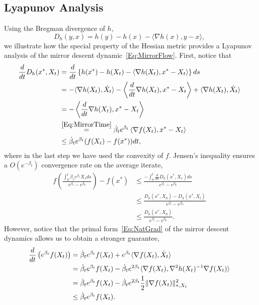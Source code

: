 \documentclass[11pt]{article}
\theoremstyle{plain}
\begin{document}
\subsection{Lyapunov Analysis}
Using the Bregman divergence of $h$,
\begin{equation}
D_h(y,x) = h(y) - h(x) - \langle \nabla h(x), y- x\rangle, 
\end{equation}
we illustrate how the special property of the Hessian metric provides a Lyapunov analysis of the mirror descent dynamic~\eqref{Eq:MirrorFlow}. First, notice that 
\begin{subequations}\label{Eq:Disc}
\begin{align}
\frac{d}{dt} D_h(x^\ast,X_t) & =  \frac{d}{dt} \left\{h(x^\ast) - h(X_t) - \langle \nabla h(X_t), x^\ast- X_t\rangle \right\} ds\notag\\
& = - \langle \nabla h(X_t), \dot X_t\rangle -\left\langle \frac{d}{dt} \nabla h(X_t),x^\ast - X_t\right\rangle  + \langle \nabla h(X_t), \dot X_t\rangle \notag\\
&=  -\left\langle \frac{d}{dt} \nabla h(X_t),x^\ast - X_t\right\rangle\notag\\
& \overset{\eqref{Eq:MirrorTime}}{=}  \dot \beta_t e^{\beta_t} \left\langle \nabla f(X_t), x^\ast - X_t\right\rangle \notag\\
& \leq  \dot \beta_t e^{\beta_t} (f(X_t) - f(x^\ast)) dt,\label{Eq:Bound1} 
\end{align}
\end{subequations}
where in the last step we have used the convexity of $f$. Jensen's inequality ensures a $O(e^{-\beta_t})$ convergence rate on the average iterate,  %
\begin{align*}
f\left(\frac{\int_0^t \dot \beta_s e^{\beta_s} X_s ds}{e^{\beta_t} - e^{\beta_0}}\right) - f(x^\ast) &\leq \frac{ - \int_0^t \frac{d}{ds} D_h(x^\ast,X_s)ds}{e^{\beta_t} - e^{\beta_0}} \\
&\leq \frac{D_h(x^\ast,X_0) - D_h(x^\ast, X_t)}{e^{\beta_t} - e^{\beta_0}}\\
&\leq \frac{D_h(x^\ast,X_0)}{e^{\beta_t} - e^{\beta_0}}.
\end{align*}
 However, notice that the primal form~\eqref{Eq:NatGrad} of the mirror descent dynamics allows us to obtain a stronger guarantee,
 \begin{subequations}\label{Eq:Lem}
 \begin{align}
\frac{d}{dt}\left( e^{\beta_t} f(X_t) \right) &= \dot \beta_t e^{\beta_t} f(X_t) + e^{\beta_t}\langle \nabla f(X_t), \dot X_t\rangle\notag \\
&= \dot \beta_t e^{\beta_t}f(X_t) - \dot \beta_t e^{2\beta_t}\langle \nabla f(X_t), \nabla^2 h(X_t)^{-1}\nabla f(X_t)\rangle \notag\\
& = \dot \beta_t e^{\beta_t}f(X_t) - \dot \beta_t e^{2\beta_t}\frac{1}{2}\|\nabla f(X_t)\|_{\ast,X_t}^2 \notag \\
&\leq \dot \beta_t e^{\beta_t}f(X_t). 
\end{align}
\end{subequations}
\end{document}
